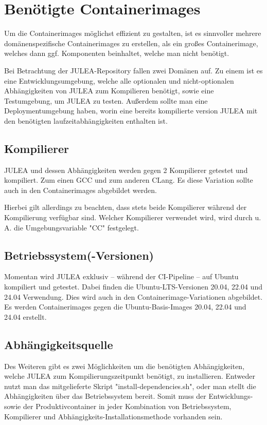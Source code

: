 \section{Benötigte Containerimages}

Um die Containerimages möglichst effizient zu gestalten, ist es sinnvoller mehrere domänenspezifische Containerimages zu erstellen, als ein großes Containerimage, welches dann ggf. Komponenten beinhaltet, welche man nicht benötigt.

Bei Betrachtung der JULEA-Repository fallen zwei Domänen auf. Zu einem ist es eine Entwicklungsumgebung, welche alle optionalen und nicht-optionalen Abhängigkeiten von JULEA zum Kompilieren benötigt, sowie eine Testumgebung, um JULEA zu testen. Außerdem sollte man eine Deploymentumgebung haben, worin eine bereits kompilierte version JULEA mit den benötigten laufzeitabhängigkeiten enthalten ist.

\subsection{Kompilierer}

JULEA und dessen Abhängigkeiten werden gegen 2 Kompilierer getestet und kompiliert. Zum einen GCC und zum anderen CLang.
Es diese Variation sollte auch in den Containerimages abgebildet werden. 

Hierbei gilt allerdings zu beachten, dass stets beide Kompilierer während der Kompilierung verfügbar sind. Welcher Kompilierer verwendet wird, wird durch u. A. die Umgebungsvariable "CC" festgelegt.  

\subsection{Betriebssystem(-Versionen)}

Momentan wird JULEA exklusiv – während der CI-Pipeline – auf Ubuntu kompiliert und getestet. Dabei finden die Ubuntu-LTS-Versionen 20.04, 22.04 und 24.04 Verwendung. Dies wird auch in den Containerimage-Variationen abgebildet. Es werden Containerimages gegen die Ubuntu-Basis-Images 20.04, 22.04 und 24.04 erstellt.

\subsection{Abhängigkeitsquelle}

Des Weiteren gibt es zwei Möglichkeiten um die benötigten Abhängigkeiten, welche JULEA zum Kompilierungszeitpunkt benötigt, zu installieren. Entweder nutzt man das mitgelieferte Skript "install-dependencies.sh", oder man stellt die Abhängigkeiten über das Betriebssystem bereit. Somit muss der Entwicklungs- sowie der Produktivcontainer in jeder Kombination von Betriebssystem, Kompilierer und Abhängigkeits-Installationsmethode vorhanden sein.


